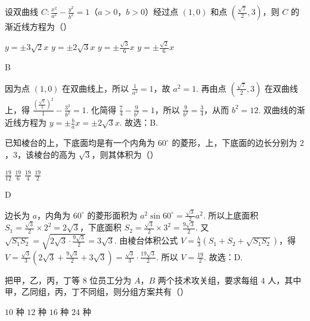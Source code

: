 \begin{problem}
设双曲线 \(C:\frac{x^2}{a^2}-\frac{y^2}{b^2}=1\)（\(a>0\)，\(b>0\)）经过点 \(\left( 1,0 \right)\) 和点 \(\left( \frac{\sqrt{7}}{2},3 \right)\)，则 \(C\) 的渐近线方程为（\quad）

\choices
    {\(y=\pm 3\sqrt{2}x\)}
    {\(y=\pm 2\sqrt{3}x\)}
    {\(y=\pm \frac{\sqrt{3}}{6}x\)}
    {\(y=\pm \frac{\sqrt{2}}{6}x\)}
\end{problem}

\begin{answer}
B
\end{answer}

\begin{solution}
因为点 \(\left( 1,0 \right)\) 在双曲线上，所以 \(\frac{1}{a^2}=1\)，故 \(a^2=1\).
再由点 \(\left( \frac{\sqrt{7}}{2},3 \right)\) 在双曲线上，得 \(\frac{\left( \frac{\sqrt{7}}{2} \right)^2}{1}-\frac{3^2}{b^2}=1\). 化简得 \(\frac{7}{4}-\frac{9}{b^2}=1\)，所以 \(\frac{9}{b^2}=\frac{3}{4}\)，从而 \(b^2=12\). 双曲线的渐近线方程为 \(y=\pm \frac{b}{a}x=\pm 2\sqrt{3}x\). 故选：B.
\end{solution}

\begin{problem}
已知棱台的上，下底面均是有一个内角为 \(60^\circ\) 的菱形，上，下底面的边长分别为 \(2\)，\(3\)，该棱台的高为 \(\sqrt{3}\)，则其体积为（\quad）

\choices
    {\(\frac{19}{12}\)}
    {\(\frac{19}{6}\)}
    {\(\frac{19}{4}\)}
    {\(\frac{19}{2}\)}
\end{problem}

\begin{answer}
D
\end{answer}

\begin{solution}
边长为 \(a\)，内角为 \(60^\circ\) 的菱形面积为 \(a^2\sin 60^\circ=\frac{\sqrt{3}}{2}a^2\). 所以上底面积 \(S_1=\frac{\sqrt{3}}{2}\times 2^2=2\sqrt{3}\)，下底面积 \(S_2=\frac{\sqrt{3}}{2}\times 3^2=\frac{9\sqrt{3}}{2}\). 又 \(\sqrt{S_1S_2}=\sqrt{2\sqrt{3}\cdot \frac{9\sqrt{3}}{2}}=3\sqrt{3}\). 由棱台体积公式 \(V=\frac{h}{3}\left( S_1+S_2+\sqrt{S_1S_2} \right)\)，得 \(V=\frac{\sqrt{3}}{3}\left( 2\sqrt{3}+\frac{9\sqrt{3}}{2}+3\sqrt{3} \right)=\frac{\sqrt{3}}{3}\cdot \frac{19\sqrt{3}}{2}\). 所以 \(V=\frac{19}{2}\).
故选：D.
\end{solution}

\begin{problem}
把甲，乙，丙，丁等 \(8\) 位员工分为 \(A\)，\(B\) 两个技术攻关组，要求每组 \(4\) 人，其中甲，乙同组，丙，丁不同组，则分组方案共有（\quad）

\choices
    {\(10\) 种}
    {\(12\) 种}
    {\(16\) 种}
    {\(24\) 种}
\end{problem}

